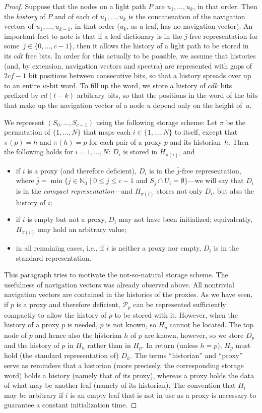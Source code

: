 \documentclass[envcountsame,envcountsect,undated,nolinenumbers]{lnthi}
\def\TbbbN{\mathbb{N}}
\def\jj{{\bar j}}
\begin{document}
\begin{proof}
Suppose that the nodes on a light path $P$
are $u_1,\ldots,u_k$, in that order.
Then the \emph{history} of
$P$ and of each of $u_1,\ldots,u_k$
is the concatenation of the
navigation vectors of $u_1,\ldots,u_{k-1}$,
in that order ($u_k$, as a leaf, has
no navigation vector).
An important fact to note is that if
a leaf dictionary
is in the $\jj$-free representation for some~$\jj\in\{0,\ldots,c-1\}$,
then it allows the history of a light path to be stored
in its $c d t$ free bits.
In order for this actually to be possible, we assume
that histories (and, by extension,
navigation vectors and spectra) are represented with 
gaps of $2 c f-1$ bit positions between consecutive bits,
so that a history spreads over up to an entire
$w$-bit word.
To fill up the word,
we store a history of $c d k$ bits
prefixed by $c d(t-k)$ arbitrary bits,
so that the positions in the word of the bits that make up
the navigation vector of a node $u$
depend only on the height of~$u$.

We represent $(S_0,\ldots,S_{c-1})$ using the following
storage scheme:
Let $\pi$ be the permutation of $\{1,\ldots,N\}$
that maps each $i\in\{1,\ldots,N\}$ to itself,
except that $\pi(p)=h$ and $\pi(h)=p$ for each
pair of a proxy $p$ and its historian~$h$.
Then the following holds for $i=1,\ldots,N$:
$D_i$ is stored in $H_{\pi(i)}$, and
\begin{itemize}
\item
if $i$ is a proxy (and therefore deficient),
$D_i$ is in the $\jj$-free representation,
where $\jj=\min\{j\in\TbbbN_0\mid 0\le j\le c-1$ and
$S_j\cap U_i=\emptyset\}$---we
will say that
$D_i$ is in the
\emph{compact representation}---and
$H_{\pi(i)}$ stores not only $D_i$, but also the history of $i$;
\item
if $i$ is empty but not a proxy,
$D_i$ may not have been initialized;
equivalently, $H_{\pi(i)}$ may hold an arbitrary value;
\item
in all remaining cases, i.e., if $i$ is neither a
proxy nor empty,
$D_i$
is in the standard representation.
\end{itemize}

\noindent
This paragraph tries to motivate the
not-so-natural storage scheme.
The usefulness of navigation vectors was
already observed above.
All nontrivial navigation vectors
are contained in the histories of the proxies.
As we have seen, if $p$ is a proxy and
therefore deficient, $\mathcal{P}_p$ can
be represented sufficiently compactly to allow
the history of $p$ to be stored with it.
However, when the history of a proxy $p$
is needed, $p$ is not known, so $H_p$ cannot
be located.
The top node of $p$ and hence also the
historian $h$ of $p$ are known, however, so
we store $D_p$ and the history of $p$
in $H_h$ rather than in $H_p$.
In return (unless $h=p$), $H_p$ must hold
(the standard representation of) $D_h$.
The terms ``historian'' and ``proxy'' serve as reminders
that a historian (more precisely, the
corresponding storage word) holds a history
(namely that of its proxy), whereas a proxy
holds the data of what may be
another leaf (namely of its historian).
The convention that $H_i$ may be arbitrary if
$i$ is an empty leaf that is not in use as a proxy
is necessary to guarantee
a constant initialization time.


\end{proof}
\end{document}
